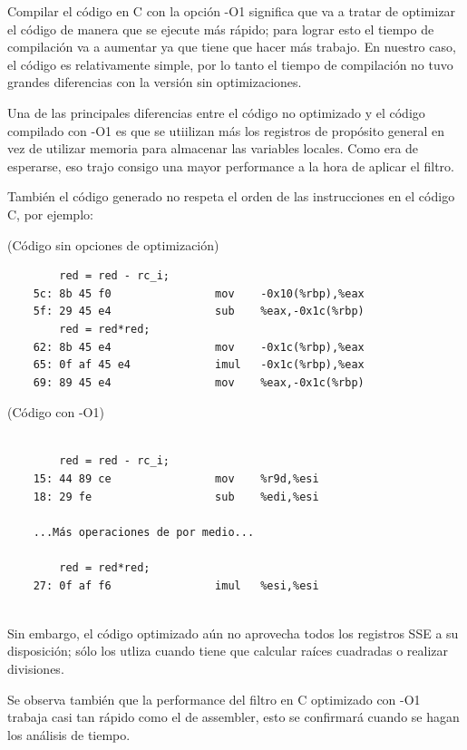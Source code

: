 		Compilar el código en C con la opción -O1 significa que va a tratar de optimizar el código de manera que se ejecute más rápido; para lograr esto el tiempo de compilación va a aumentar ya que tiene que hacer más trabajo. En nuestro caso, el código es relativamente simple, por lo tanto el tiempo de compilación no tuvo grandes diferencias con la versión sin optimizaciones.

		Una de las principales diferencias entre el código no optimizado y el código compilado con -O1 es que se utiilizan más los registros de propósito general en vez de utilizar memoria para almacenar las variables locales. Como era de esperarse, eso trajo consigo una mayor performance a la hora de aplicar el filtro.

		También el código generado no respeta el orden de las instrucciones en el código C, por ejemplo:
		
\vspace{1 cm}

(C\'odigo sin opciones de optimizaci\'on)
\begin{verbatim}
        red = red - rc_i;
    5c: 8b 45 f0             	mov    -0x10(%rbp),%eax
    5f: 29 45 e4             	sub    %eax,-0x1c(%rbp)
        red = red*red;
    62: 8b 45 e4             	mov    -0x1c(%rbp),%eax
    65: 0f af 45 e4          	imul   -0x1c(%rbp),%eax
    69: 89 45 e4             	mov    %eax,-0x1c(%rbp)
\end{verbatim}

\vspace{1 cm}

(C\'odigo con -O1)
\begin{verbatim}

        red = red - rc_i;
    15: 44 89 ce             	mov    %r9d,%esi
    18: 29 fe                	sub    %edi,%esi
  
    ...Más operaciones de por medio...
  
        red = red*red;
    27: 0f af f6             	imul   %esi,%esi
	
\end{verbatim}
  
  
	Sin embargo, el código optimizado aún no aprovecha todos los registros SSE a su disposición; sólo los utliza cuando tiene que calcular raíces cuadradas o realizar divisiones.

	Se observa también que la performance del filtro en C optimizado con -O1 trabaja casi tan rápido como el de assembler, esto se confirmará cuando se hagan los análisis de tiempo.

